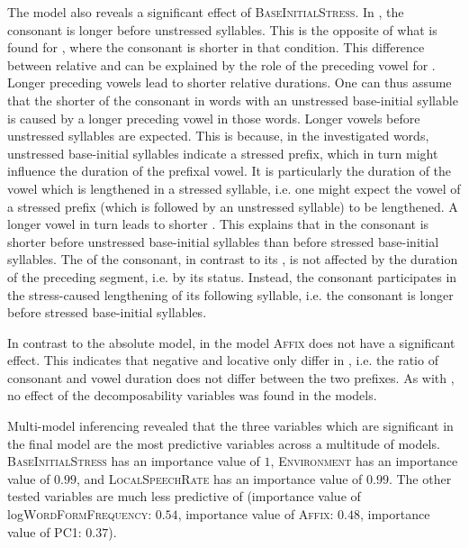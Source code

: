 The model also reveals a significant effect of \textsc{BaseInitialStress}. In , the consonant is longer before unstressed syllables. This is the opposite of what is found for , where the consonant is shorter in that condition. 
This difference between relative and  can be explained by the role of the preceding vowel for . Longer preceding vowels lead to shorter relative durations. One can thus assume that the shorter  of the consonant in words with an unstressed base-initial syllable is caused by a longer preceding vowel in those words.
Longer vowels before unstressed syllables are expected. This is because, in the investigated words, unstressed base-initial syllables indicate a stressed prefix, which in turn might influence the duration of the prefixal vowel. It is particularly the duration of the vowel which is lengthened in a stressed syllable, i.e. one might expect the vowel of a stressed prefix (which is followed by an unstressed syllable) to be lengthened. A longer vowel in turn leads to shorter . This explains that in  the consonant is shorter before unstressed base-initial syllables than before stressed base-initial syllables.
The  of the consonant, in contrast to its , is not affected by the duration of the preceding segment, i.e. by its  status. Instead, the consonant participates in the stress-caused lengthening of its following syllable, i.e. the consonant is longer before stressed base-initial syllables. %

In contrast to the absolute model, in the  model \textsc{Affix} does not have a significant effect. This indicates that negative and locative  only differ in , i.e. the ratio of consonant and vowel duration does not differ between the two prefixes. 
As with , no effect of the decomposability variables was found in the  models. 

Multi-model inferencing revealed that the three variables which are significant in the final model are the most predictive variables across a multitude of models. \textsc{BaseInitialStress} has an importance value of $1$, \textsc{Environment}  has an importance value of $0.99$,  and  \textsc{LocalSpeechRate} has an importance value of $0.99$. The other tested variables are much less predictive of  (importance value of log\textsc{WordFormFrequency}: $0.54$, importance value of \textsc{Affix}: $0.48$, importance value of \textsc{PC1}: $0.37$). 



